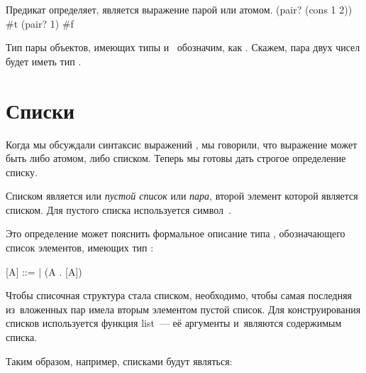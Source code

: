 \begin{example}{%
Предикат  определяет, является выражение парой или атомом.}
\REPL
  {(pair? (cons 1 2))}
  {\#t}
\REPL
  {(pair? 1)}
  {\#f}
\end{example}

Тип пары объектов, имеющих типы  и~ обозначим, как \mbox{}. Скажем, пара двух чисел будет иметь тип .

\section[2]{Списки}%
Когда мы обсуждали синтаксис выражений \Scheme, мы говорили, что выражение может быть либо атомом, либо списком. Теперь мы готовы дать строгое определение списку.

Списком является или \emph{пустой список} или \emph{пара}, второй элемент которой является списком. Для пустого списка используется символ~.

Это определение может пояснить формальное описание типа \Type{[A]}, обозначающего список элементов, имеющих тип :

\begin{type}\item\label{list-type}
[A] ::=  | (A . [A])
\end{type}

Чтобы списочная структура стала списком, необходимо, чтобы самая последняя из~вложенных пар имела вторым элементом пустой список. Для конструирования списков используется функция \si{list}~--- её аргументы и~являются содержимым списка.

Таким образом, например, списками будут являться:

